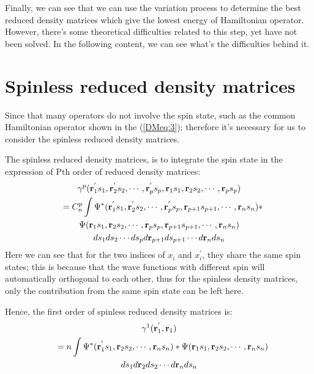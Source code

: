 Finally, we can see that we can use the variation process to determine
the best reduced density matrices which give the lowest energy of
Hamiltonian operator. However, there's some theoretical difficulties
related to this step, yet have not been solved. In the following
content, we can see what's the difficulties behind it.

\section{Spinless reduced density matrices}
%
%
Since that many operators do not involve the spin state, such as the
common Hamiltonian operator shown in the (\ref{DMeq:3}); therefore
it's necessary for us to consider the spinless reduced density
matrices.

The spinless reduced density matrices, is to integrate the spin state
in the expression of Pth order of reduced density matrices:
\begin{multline}\label{DMeq:11}
  \gamma^{p}(\mathbf{r}^{'}_{1}s_{1}, \mathbf{r}^{'}_{2}s_{2}, \cdots,
  \mathbf{r}^{'}_{p}s_{p}, \mathbf{r}_{1}s_{1}, \mathbf{r}_{2}s_{2},
  \cdots, \mathbf{r}_{p}s_{p}) \\
  \shoveleft{= C^{p}_{n}\int \Psi^{*}(\mathbf{r}^{'}_{1}s_{1},
    \mathbf{r}^{'}_{2}s_{2}, \cdots, \mathbf{r}^{'}_{p}s_{p},
    \mathbf{r}_{p+1}s_{p+1},
    \cdots, \mathbf{r}_{n}s_{n})*} \\
  \Psi(\mathbf{r}_{1}s_{1}, \mathbf{r}_{2}s_{2}, \cdots,
  \mathbf{r}_{p}s_{p}, \mathbf{r}_{p+1}s_{p+1}, \cdots,
  \mathbf{r}_{n}s_{n}) \\
  ds_{1}ds_{2}\cdots ds_{p}d\mathbf{r}_{p+1}ds_{p+1}\cdots
  d\mathbf{r}_{n}ds_{n}
\end{multline}
Here we can see that for the two indices of $x_{i}$ and
$x^{'}_{i}$, they share the same spin states; this is because that the
wave functions with different spin will automatically orthogonal to
each other, thus for the spinless density matrices, only the
contribution from the same spin state can be left here.

Hence, the first order of spinless reduced density matrices is:
\begin{multline}\label{}
  \gamma^{1}(\mathbf{r}^{'}_{1}, \mathbf{r}_{1}) \\
  \shoveleft{= n \int \Psi^{*}(\mathbf{r}^{'}_{1}s_{1},
    \mathbf{r}_{2}s_{2}, \cdots, \mathbf{r}_{n}s_{n})*
    \Psi(\mathbf{r}_{1}s_{1}, \mathbf{r}_{2}s_{2}, \cdots,
    \mathbf{r}_{n}s_{n}) } \\
  ds_{1}d\mathbf{r}_{2}ds_{2}\cdots d\mathbf{r}_{n}ds_{n}
\end{multline}

